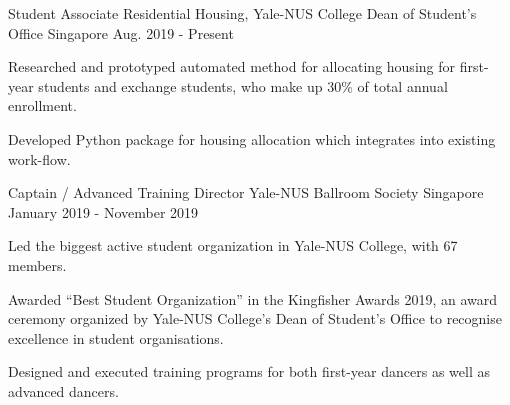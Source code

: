 \begin{cventries}
  \cventry
  {Student Associate}
  {Residential Housing, Yale-NUS College Dean of Student's Office}
  {Singapore}
  {Aug. 2019 - Present}
  {
    \begin{cvitems}
    \item {Researched and prototyped automated method for allocating housing for
        first-year students and exchange students, who make up 30\% of total
        annual enrollment.}
    \item {Developed Python package for housing allocation which integrates into
        existing work-flow.}
    \end{cvitems}
  }
  \cventry
  {Captain / Advanced Training Director}
  {Yale-NUS Ballroom Society}
  {Singapore}
  {January 2019 - November 2019}
  {
    \begin{cvitems}
    \item {Led the biggest active student organization in Yale-NUS College, with
      67 members.}
    \item {Awarded ``Best Student Organization'' in the Kingfisher Awards 2019,
        an award ceremony organized by Yale-NUS College's Dean of Student's
        Office to recognise excellence in student organisations.}
    \item {Designed and executed training programs for both first-year dancers
        as well as advanced dancers.}
    \end{cvitems}
  }

\end{cventries}
